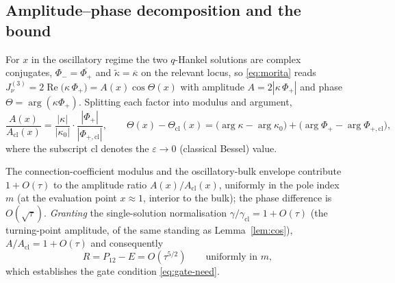 \subsection{Amplitude--phase decomposition and the bound}
For $x$ in the oscillatory regime the two $q$-Hankel solutions are complex conjugates,
$\Phi_{-}=\overline{\Phi_{+}}$ and $\tilde\kappa=\overline{\kappa}$ on the relevant locus,
so \eqref{eq:morita} reads $J^{(3)}_\nu=2\operatorname{Re}\!\big(\kappa\,\Phi_{+}\big)
=A(x)\cos\Theta(x)$ with amplitude $A=2|\kappa\,\Phi_+|$ and phase
$\Theta=\arg(\kappa\Phi_+)$. Splitting each factor into modulus and argument,
\begin{equation}\label{eq:ampphase}
   \frac{A(x)}{A_{\mathrm{cl}}(x)}
     =\frac{|\kappa|}{|\kappa_0|}\cdot\frac{|\Phi_+|}{|\Phi_{+,\mathrm{cl}}|},
   \qquad
   \Theta(x)-\Theta_{\mathrm{cl}}(x)
     =\big(\arg\kappa-\arg\kappa_0\big)+\big(\arg\Phi_+-\arg\Phi_{+,\mathrm{cl}}\big),
\end{equation}
where the subscript $\mathrm{cl}$ denotes the $\varepsilon\to0$ (classical Bessel) value.

\begin{theorem}\label{thm:R}
The connection-coefficient modulus and the oscillatory-bulk envelope contribute
$1+O(\tau)$ to the amplitude ratio $A(x)/A_{\mathrm{cl}}(x)$, uniformly in the pole index $m$
(at the evaluation point $x\approx1$, interior to the bulk); the phase difference is
$O(\sqrt\tau)$. \emph{Granting} the single-solution normalisation
$\gamma/\gamma_{\mathrm{cl}}=1+O(\tau)$ (the turning-point amplitude, of the same standing as
Lemma~\ref{lem:cos}), $A/A_{\mathrm{cl}}=1+O(\tau)$ and consequently
\[
   R=P_{12}-E=O(\tau^{5/2})\qquad\text{uniformly in }m,
\]
which establishes the gate condition \eqref{eq:gate-need}.
\end{theorem}

